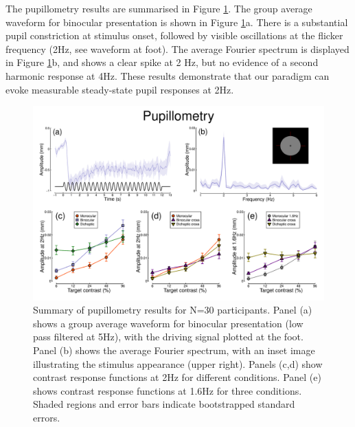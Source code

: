 \documentclass[
]{article}
\begin{document}
The pupillometry results are summarised in Figure \ref{fig:pupildata}. The group average waveform for binocular presentation is shown in Figure \ref{fig:pupildata}a. There is a substantial pupil constriction at stimulus onset, followed by visible oscillations at the flicker frequency (2Hz, see waveform at foot). The average Fourier spectrum is displayed in Figure \ref{fig:pupildata}b, and shows a clear spike at 2 Hz, but no evidence of a second harmonic response at 4Hz. These results demonstrate that our paradigm can evoke measurable steady-state pupil responses at 2Hz.

\begin{figure}

{\centering \includegraphics{Figures/pupildata} 

}

\caption{Summary of pupillometry results for N=30 participants. Panel (a) shows a group average waveform for binocular presentation (low pass filtered at 5Hz), with the driving signal plotted at the foot. Panel (b) shows the average Fourier spectrum, with an inset image illustrating the stimulus appearance (upper right). Panels (c,d) show contrast response functions at 2Hz for different conditions. Panel (e) shows contrast response functions at 1.6Hz for three conditions. Shaded regions and error bars indicate bootstrapped standard errors.}\label{fig:pupildata}
\end{figure}
\end{document}
